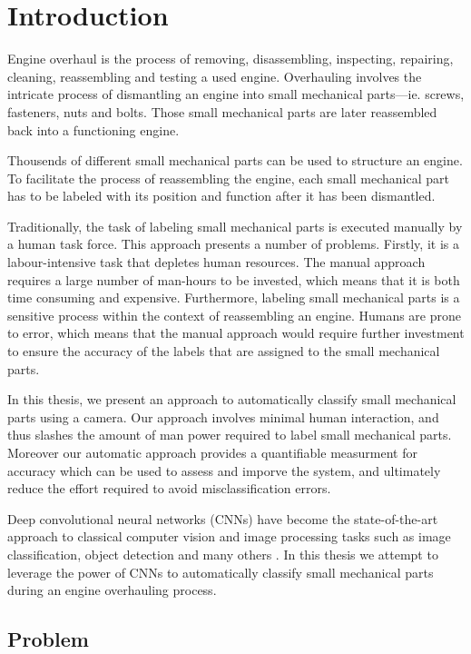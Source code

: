 \documentclass[a4paper,12pt,twoside]{report}
\begin{document}
\chapter{Introduction}

Engine overhaul is the process of removing, disassembling, inspecting, repairing, cleaning, reassembling and testing a used engine. Overhauling involves the intricate process of dismantling an engine into small mechanical parts—ie. screws, fasteners, nuts and bolts. Those small mechanical parts are later reassembled back into a functioning engine.

Thousends of different small mechanical parts can be used to structure an engine. To facilitate the process of reassembling the engine, each small mechanical part has to be labeled with its position and function after it has been dismantled.

Traditionally, the task of labeling small mechanical parts is executed manually by a human task force. This approach presents a number of problems. Firstly, it is a labour-intensive task that depletes human resources. The manual approach requires a large number of man-hours to be invested, which means that it is both time consuming and expensive. Furthermore, labeling small mechanical parts is a sensitive process within the context of reassembling an engine. Humans are prone to error, which means that the manual approach would require further investment to ensure the accuracy of the labels that are assigned to the small mechanical parts.

In this thesis, we present an approach to automatically classify small mechanical parts using a camera. Our approach involves minimal human interaction, and thus slashes the amount of man power required to label small mechanical parts. Moreover our automatic approach provides a quantifiable measurment for accuracy which can be used to assess and imporve the system, and ultimately reduce the effort required to avoid misclassification errors.

Deep convolutional neural networks (CNNs) have become the state-of-the-art approach to classical computer vision and image processing tasks such as image classification, object detection and many others \cite{krizhevsky2012imagenet} \cite{szegedy2015going}. In this thesis we attempt to leverage the power of CNNs to automatically classify small mechanical parts during an engine overhauling process.

\section{Problem}
\end{document}
